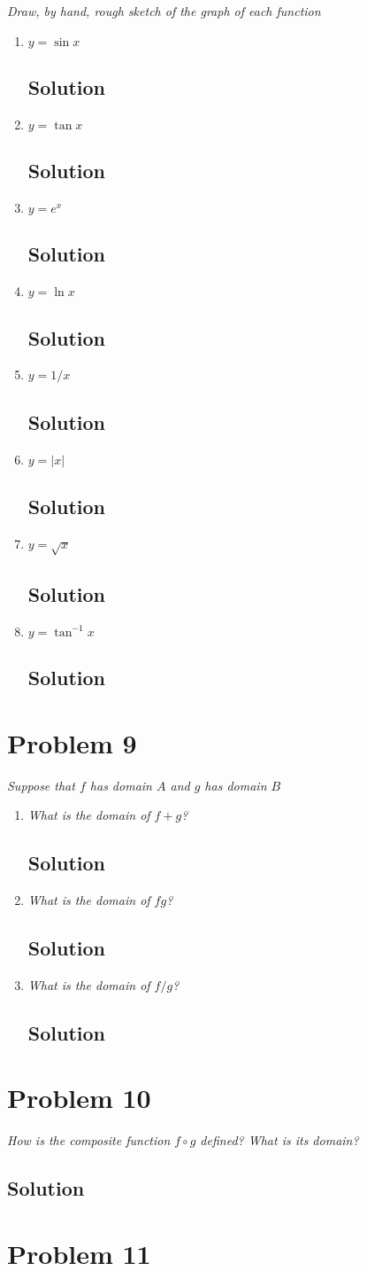 \documentclass[11pt]{article}
\newcommand{\soln}{\subsection*}
\newcommand{\qn}{\textit}
\begin{document}
\qn{Draw, by hand, rough sketch of the graph of each function}
\begin{enumerate}
	\item \qn{$y=\sin{x}$}
	\soln{Solution}
	
	\item \qn{$y=\tan{x}$}
	\soln{Solution}
	
	\item \qn{$y=e^x$}
	\soln{Solution}
	
	\item \qn{$y=\ln{x}$}
	\soln{Solution}
	
	\item \qn{$y=1/x$}
	\soln{Solution}
	
	\item \qn{$y=|x|$}
	\soln{Solution}
	
	\item \qn{$y=\sqrt{x}$}
	\soln{Solution}
	
	\item \qn{$y=\tan^{-1}{x}$}
	\soln{Solution}
\end{enumerate}

\section*{Problem 9}

\qn{Suppose that $f$ has domain $A$ and $g$ has domain $B$}
\begin{enumerate}
	\item \qn{What is the domain of $f+g$?}
	\soln{Solution}
	
	\item \qn{What is the domain of $fg$?}
	\soln{Solution}
	
	\item \qn{What is the domain of $f/g$?}
	\soln{Solution}
\end{enumerate}

\section*{Problem 10}

\qn{How is the composite function $f \circ g$ defined? What is its domain?}
\soln{Solution}

\section*{Problem 11}
\end{document}
